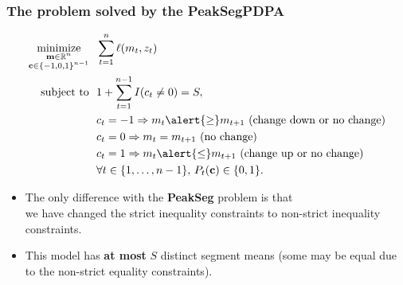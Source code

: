 \documentclass{beamer}
\DeclareMathOperator*{\minimize}{minimize}
\newcommand{\RR}{\mathbb R}
\begin{document}
\begin{frame}
  \frametitle{The problem solved by the PeakSegPDPA}
\begin{align*}
    \minimize_{\substack{
  \mathbf m\in\RR^{n}
\\
  \mathbf c\in\{-1,0,1\}^{n-1}
  }} &\ \ 
    \sum_{t=1}^n \ell( m_t,  z_t) 
  \label{PeakSegPDPA}
\\
    \text{subject to} &\ \  1+ \sum_{t=1}^{n-1} I(c_t \neq 0) = S, 
\nonumber\\
& \ \ c_t = -1 \Rightarrow m_{t} \alert{\geq} m_{t+1} \text{ (change down or no change)}
\nonumber\\
& \ \ c_t = 0 \Rightarrow m_{t} = m_{t+1}  \text{ (no change)}
\nonumber\\
& \ \ c_t = 1 \Rightarrow m_{t} \alert{\leq} m_{t+1} \text{ (change up or no change)}
\nonumber\\
&\ \ \forall t\in\{1, \dots, n-1\},\, P_t(\mathbf c) \in\{0, 1\}.
\nonumber
\end{align*}
\begin{itemize}
\item The only difference with the \textbf{PeakSeg} problem is that\\
  \alert{we have changed the strict inequality constraints to non-strict inequality
constraints}. 
\item This model has \textbf{at most} $S$ distinct
  segment means (some may be equal due to the non-strict equality
  constraints).
\end{itemize}
\end{frame}



% 

% 

% 




\end{document}
